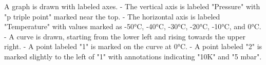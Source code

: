 A graph is drawn with labeled axes.  
- The vertical axis is labeled "Pressure" with "p triple point" marked near the top.  
- The horizontal axis is labeled "Temperature" with values marked as -50°C, -40°C, -30°C, -20°C, -10°C, and 0°C.  
- A curve is drawn, starting from the lower left and rising towards the upper right.  
- A point labeled "1" is marked on the curve at 0°C.  
- A point labeled "2" is marked slightly to the left of "1" with annotations indicating "10K" and "5 mbar".